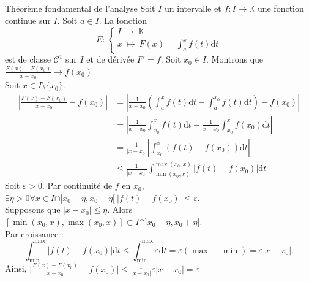 \documentclass[11pt]{article}
\newcommand*{\K}{\mathbb{K}}
\newcommand*{\m}{\mathcal}
\newcommand{\0}{\varnothing}
\newcommand*{\e}{\varepsilon}
\newcommand{\dt}{\textrm{d}t}
\begin{document}
\begin{thm}{Théorème fondamental de l'analyse}{}
    Soit $I$ un intervalle et $f:I\to\K$ une fonction continue sur $I$. Soit $a\in I$. La fonction
    \begin{equation*}
        E: \begin{cases}
           I~\to~\K\\
           x~\mapsto~F(x) = \int_a^xf(t)\dt 
        \end{cases}
    \end{equation*}
    est de classe $\m{C}^1$ sur $I$ et de dérivée $F'=f$.
    \tcblower
    Soit $x_0\in I$. Montrons que $\frac{F(x)-F(x_0)}{x-x_0}\to f(x_0)$\\
    Soit $x\in I\setminus\{x_0\}$.
    \begin{align*}
        \left|\frac{F(x)-F(x_0)}{x-x_0}-f(x_0)\right|&=\left|\frac{1}{x-x_0}\left(\int_a^xf(t)\dt-\int_a^{x_0}f(t)\dt\right)-f(x_0)\right|\\
        &=\left|\frac{1}{x-x_0}\int_{x_0}^xf(t)\dt-\frac{1}{x-x_0}\int_{x_0}^xf(x_0)\dt\right|\\
        &=\frac{1}{|x-x_0|}\left|\int_{x_0}^x(f(t)-f(x_0))\dt\right|\\
        &\leq\frac{1}{|x-x_0|}\int_{\min(x_0,x)}^{\max(x_0,x)}\left|f(t)-f(x_0)\right|\dt
    \end{align*}
    Soit $\e>0$. Par continuité de $f$ en $x_0$, $\exists \eta>0 \forall x \in I\cap]x_0-\eta,x_0+\eta[~|f(t)-f(x_0)|\leq\e$.\\
    Supposons que $|x-x_0|\leq\eta$. Alors $[\min(x_0,x), \max(x_0,x)]\subset I\cap]x_0-\eta,x_0+\eta[$.\\
    Par croissance :
    \begin{equation*}
        \int_{\min}^{\max}\Big|f(t)-f(x_0)\Big|\dt\leq\int_{\min}^{\max}\e\dt = \e(\max - \min) = \e|x-x_0|.
    \end{equation*}
    Ainsi, $\Big|\frac{F(x)-F(x_0)}{x-x_0}-f(x_0)\Big|\leq\frac{1}{|x-x_0|}\e|x-x_0|=\e$
\end{thm}
\end{document}
